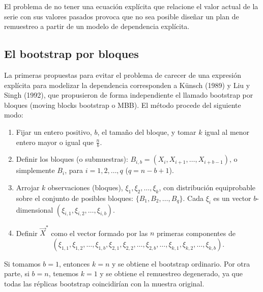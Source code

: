 \documentclass[]{book}
\theoremstyle{definition}
\theoremstyle{definition}
\theoremstyle{definition}
\theoremstyle{remark}
\begin{document}
El problema de no tener una ecuación explícita que relacione el valor
actual de la serie con sus valores pasados provoca que no sea posible
diseñar un plan de remuestreo a partir de un modelo de dependencia
explícita.

\subsection{El bootstrap por bloques}\label{el-bootstrap-por-bloques}

La primeras propuestas para evitar el problema de carecer de una
expresión explícita para modelizar la dependencia corresponden a Künsch
(1989) y Liu y Singh (1992), que propusieron de forma independiente el
llamado bootstrap por bloques (moving blocks bootstrap o MBB). El método
procede del siguiente modo:

\begin{enumerate}
\def\labelenumi{\arabic{enumi}.}
\item
  Fijar un entero positivo, \(b\), el tamaño del bloque, y tomar \(k\)
  igual al menor entero mayor o igual que \(\frac{n}{b}\).
\item
  Definir los bloques (o submuestras):
  \(B_{i,b}=(X_i,X_{i+1},\ldots ,X_{i+b-1})\), o simplemente \(B_i\),
  para \(i=1,2,\ldots ,q\) (\(q=n-b+1\))\(.\)
\item
  Arrojar \(k\) observaciones (bloques),
  \(\xi _1,\xi _2,\ldots ,\xi _{k}\), con distribución equiprobable
  sobre el conjunto de posibles bloques: \(\{B_1,B_2,\ldots ,B_{q}\}\).
  Cada \(\xi _i\) es un vector \(b\)-dimensional
  \((\xi _{i,1},\xi _{i,2},\ldots ,\xi _{i,b})\).
\item
  Definir \(\vec{X}^{\ast}\) como el vector formado por las \(n\)
  primeras componentes de
  \[(\xi _{1,1},\xi _{1,2},\ldots ,\xi _{1,b},\xi _{2,1},\xi _{2,2},\ldots ,\xi
  _{2,b},\ldots ,\xi _{k,1},\xi _{k,2},\ldots ,\xi _{k,b}).\]
\end{enumerate}

Si tomamos \(b=1\), entonces \(k=n\) y se obtiene el bootstrap
ordinario. Por otra parte, si \(b=n\), tenemos \(k=1\) y se obtiene el
remuestreo degenerado, ya que todas las réplicas bootstrap coincidirían
con la muestra original.
\end{document}

